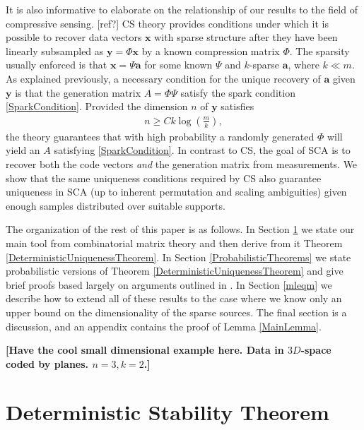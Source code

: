 \documentclass[journal, onecolumn]{IEEEtran}
\begin{document}
It is also informative to elaborate on the relationship of our results to the field of compressive sensing. [ref?] CS theory provides conditions under which it is possible to recover data vectors $\mathbf{x}$ with sparse structure after they have been linearly subsampled as $\mathbf{y} = \Phi \mathbf{x}$ by a known compression matrix $\Phi$. The sparsity usually enforced is that $\mathbf{x} = \Psi\mathbf{a}$ for some known $\Psi$ and $k$-sparse $\mathbf{a}$, where $k \ll m$. As explained previously, a necessary condition for the unique recovery of $\mathbf{a}$ given $\mathbf{y}$ is that the generation matrix $A = \Phi\Psi$ satisfy the spark condition \eqref{SparkCondition}. Provided the dimension $n$ of $\mathbf{y}$ satisfies
\begin{align}\label{CScondition}
n \geq Ck\log\left(\frac{m}{k}\right),
\end{align}
%
the theory guarantees that with high probability a randomly generated $\Phi$ will yield an $A$ satisfying \eqref{SparkCondition}. In contrast to CS, the goal of SCA is to recover both the code vectors \emph{and} the generation matrix from measurements. We show that the same uniqueness conditions required by CS also guarantee uniqueness in SCA (up to inherent permutation and scaling ambiguities) given enough samples distributed over suitable supports.

The organization of the rest of this paper is as follows. In Section \ref{DUT} we state our main tool from combinatorial matrix theory and then derive from it Theorem \ref{DeterministicUniquenessTheorem}. In Section \ref{ProbabilisticTheorems} we state probabilistic versions of Theorem \ref{DeterministicUniquenessTheorem} and give brief proofs based largely on arguments outlined in \cite{HS11}. In Section \ref{mleqm} we describe how to extend all of these results to the case where we know only an upper bound on the dimensionality of the sparse sources. The final section is a discussion, and an appendix contains the proof of Lemma \ref{MainLemma}.

\textbf{[Have the cool small dimensional example here. Data in $3D$-space coded by planes. $n=3, k=2$.]}


 

\section{Deterministic Stability Theorem}\label{DUT}
\end{document}
